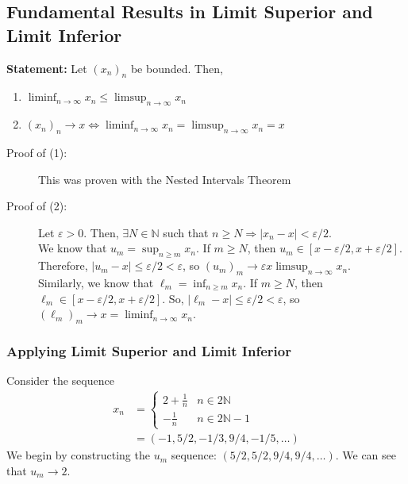 \documentclass[10pt]{extarticle}
\newcommand{\N}{\mathbb{N}}
\begin{document}
    \subsection{Fundamental Results in Limit Superior and Limit Inferior}%
    \textbf{Statement:} Let $(x_n)_n$ be bounded. Then,
    \begin{enumerate}[(1)]
      \item $\displaystyle \liminf_{n\rightarrow\infty} x_n \leq \limsup_{n\rightarrow\infty} x_n$
      \item $\displaystyle (x_n)_n\rightarrow x \Leftrightarrow \liminf_{n\rightarrow\infty}x_n = \limsup_{n\rightarrow\infty}x_n = x$
    \end{enumerate}
    \begin{description}
      \item[Proof of (1):] This was proven with the Nested Intervals Theorem
      \item[Proof of (2):] Let $\varepsilon > 0$. Then, $\exists N \in\N$ such that $n\geq N \Rightarrow |x_n - x| < \varepsilon/2$.\\

        We know that $u_m = \sup_{n\geq m}x_n$. If $m\geq N$, then $u_m \in [x-\varepsilon/2,x+\varepsilon/2]$. Therefore, $|u_m-x| \leq \varepsilon/2 < \varepsilon$, so $(u_m)_m \rightarrow \varepsilon x \limsup_{n\rightarrow\infty}x_n$.\\

        Similarly, we know that $\ell_m = \inf_{n\geq m}x_n$. If $m\geq N$, then $\ell_m \in [x-\varepsilon/2,x+\varepsilon/2]$. So, $|\ell_m - x| \leq \varepsilon/2 < \varepsilon$, so $(\ell_m)_m \rightarrow x = \liminf_{n\rightarrow\infty}x_n$.
    \end{description}
    \subsubsection{Applying Limit Superior and Limit Inferior}%
    Consider the sequence
    \begin{align*}
      x_n &= \begin{cases}
        2 + \frac{1}{n}&n\in2\N\\
        -\frac{1}{n}&n\in2\N-1
      \end{cases}\\
          &= (-1,5/2,-1/3,9/4,-1/5,\dots)
    \end{align*}
    We begin by constructing the $u_m$ sequence: $(5/2,5/2,9/4,9/4,\dots)$. We can see that $u_m \rightarrow 2$.\\
\end{document}
